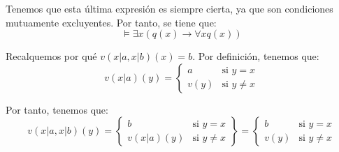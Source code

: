 \begin{ejercicio}
\begin{enumerate}
        Tenemos que esta última expresión es siempre cierta, ya que son condiciones mutuamente excluyentes. Por tanto, se tiene que:
        \[\models \exists x(q(x)\rightarrow \forall x q(x))\]
        \begin{observacion}
            Recalquemos por qué $v(x|a,x|b)(x)=b$. Por definición, tenemos que:
            \begin{equation*}
                v(x|a)(y)=\begin{cases}
                    a & \text{si } y=x\\
                    v(y) & \text{si } y\neq x
                \end{cases}
            \end{equation*}

            Por tanto, tenemos que:
            \begin{equation*}
                v(x|a,x|b)(y)=\left\{\begin{array}{ll}
                    b & \text{si } y=x\\
                    v(x|a)(y) & \text{si } y\neq x
                \end{array}\right\}
                = \left\{\begin{array}{ll}
                    b & \text{si } y=x\\
                    v(y) & \text{si } y\neq x
                \end{array}\right.
            \end{equation*}
        \end{observacion}
    \end{enumerate}
\end{ejercicio}